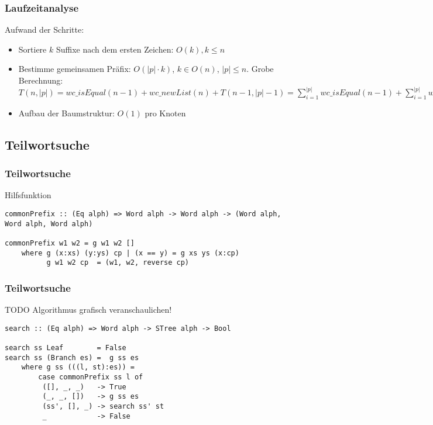 \documentclass{beamer}
\begin{document}
\begin{frame}[fragile]
\frametitle{Laufzeitanalyse}
Aufwand der Schritte:
\begin{itemize}
    \item Sortiere $k$ Suffixe nach dem ersten Zeichen: $O(k), k \le n$
    \item Bestimme gemeinsamen Präfix: $O(|p| \cdot k)$, $k \in O(n)$, $|p| \le n$.
    Grobe Berechnung: $T(n,|p|) = wc\_isEqual(n - 1) + wc\_newList(n) + T(n-1,|p|-1) = \sum_{i = 1}^{|p|}{wc\_isEqual(n-1)} + \sum_{i = 1}^{|p|}{wc\_newList(n)} \in O(|p| \cdot n)$
    \item Aufbau der Baumstruktur: $O(1)$ pro Knoten
\end{itemize}
\medskip
\end{frame}

\subsection{Teilwortsuche}

\begin{frame}[fragile]
\frametitle{Teilwortsuche}
Hilfsfunktion
\begin{lstlisting}
commonPrefix :: (Eq alph) => Word alph -> Word alph -> (Word alph, Word alph, Word alph)

commonPrefix w1 w2 = g w1 w2 []
    where g (x:xs) (y:ys) cp | (x == y) = g xs ys (x:cp)
          g w1 w2 cp  = (w1, w2, reverse cp)
\end{lstlisting}
\begin{example}

\end{example}
\end{frame}

\begin{frame}[fragile]
\frametitle{Teilwortsuche}
TODO Algorithmus grafisch veranschaulichen!
\begin{lstlisting}
search :: (Eq alph) => Word alph -> STree alph -> Bool

search ss Leaf        = False
search ss (Branch es) =  g ss es
    where g ss (((l, st):es)) =
        case commonPrefix ss l of
         ([], _, _)   -> True
         (_, _, [])   -> g ss es
         (ss', [], _) -> search ss' st
         _            -> False
\end{lstlisting}
\end{frame}
\end{document}
